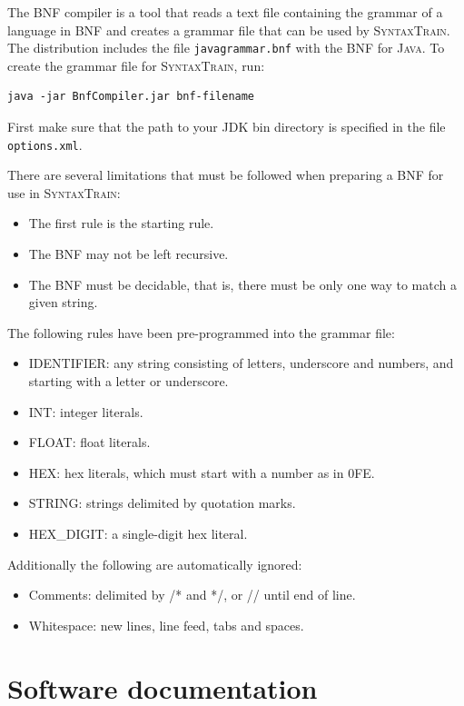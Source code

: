 \documentclass[11pt]{article}
\newcommand*{\st}{\textsc{SyntaxTrain}}
\newcommand*{\jv}{\textsc{Java}}
\begin{document}
The BNF compiler is a tool that reads a text file containing the grammar
of a language in BNF and creates a grammar file that can be
used by \st{}. The distribution includes the file
\texttt{javagrammar.bnf} with the BNF for \jv{}.
To create the grammar file for \st{}, run:
\begin{verbatim}
java -jar BnfCompiler.jar bnf-filename
\end{verbatim}
First make sure that the path to your JDK bin directory is specified
in the file \texttt{options.xml}.

There are several limitations that must be followed when preparing a BNF
for use in \st{}:

\begin{itemize}
\item The first rule is the starting rule.
\item The BNF may not be left recursive.
\item The BNF must be decidable, that is, there must be
only one way to match a given string.
\end{itemize}

The following rules have been pre-programmed into the grammar file:
\begin{itemize}
\item IDENTIFIER: any string consisting of letters, underscore and
numbers, and starting with a letter or underscore.
\item INT: integer literals.
\item FLOAT: float literals.
\item HEX: hex literals, which must start with a number as in 0FE.
\item STRING: strings delimited by quotation marks.
\item HEX\_DIGIT: a single-digit hex literal.
\end{itemize}

Additionally the following are automatically ignored:
\begin{itemize}
\item Comments: delimited by /* and */, or // until end of line.
\item Whitespace: new lines, line feed, tabs and spaces.
\end{itemize}

\section{Software documentation}\label{s.doc}
\end{document}
